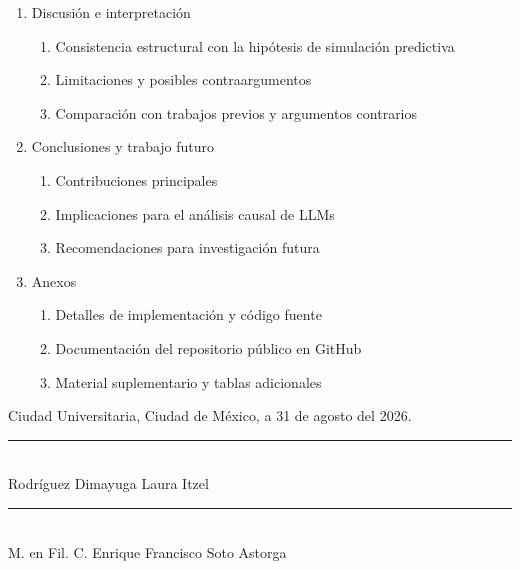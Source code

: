 \documentclass{article}
\begin{document}
\begin{enumerate}
  \item Discusión e interpretación
  \begin{enumerate}
    \item Consistencia estructural con la hipótesis de simulación predictiva
    \item Limitaciones y posibles contraargumentos
    \item Comparación con trabajos previos y argumentos contrarios
  \end{enumerate}
  \item Conclusiones y trabajo futuro
  \begin{enumerate}
    \item Contribuciones principales
    \item Implicaciones para el análisis causal de LLMs
    \item Recomendaciones para investigación futura
  \end{enumerate}
  \item Anexos
  \begin{enumerate}
    \item Detalles de implementación y código fuente
    \item Documentación del repositorio público en GitHub
    \item Material suplementario y tablas adicionales
  \end{enumerate}
\end{enumerate}

\vspace{1em}



\newpage
\printbibliography

\begin{center}
  Ciudad Universitaria, Ciudad de México, a 31 de agosto del 2026.
\end{center}

\vspace{2em}

\begin{center}
  \begin{minipage}[t]{0.42\textwidth}
    \centering
    \rule{\linewidth}{0.4pt}\\[0.5em]
    Rodríguez Dimayuga Laura Itzel
  \end{minipage}
  \hfill
  \begin{minipage}[t]{0.42\textwidth}
    \centering
    \rule{\linewidth}{0.4pt}\\[0.5em]
    M. en Fil. C. Enrique Francisco Soto Astorga
  \end{minipage}
\end{center}
\end{document}
